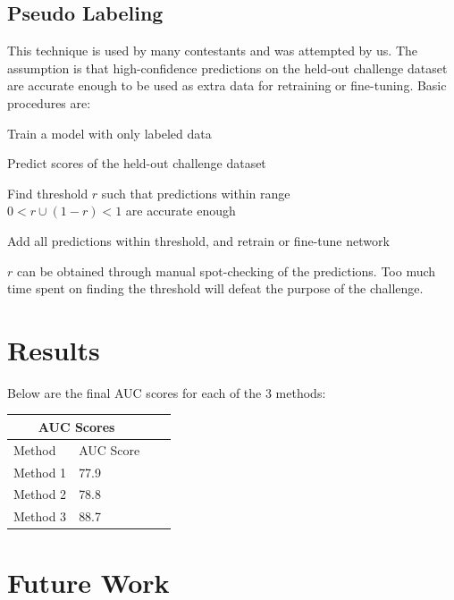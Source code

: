 \documentclass[10pt,twocolumn,letterpaper]{article}
\newenvironment{alt_enumerate}
{ \begin{enumerate}
		\setlength{\itemsep}{1pt}
		\setlength{\parskip}{1pt}
		\setlength{\parsep}{1pt} }
	{ \end{enumerate} }
\begin{document}
\subsection{Pseudo Labeling}

This technique is used by many contestants and was attempted by us. The
assumption is that high-confidence predictions on the held-out challenge
dataset are accurate enough to be used as extra data for retraining or
fine-tuning. Basic procedures are:

\begin{alt_enumerate}
	\item{Train a model with only labeled data}
	\item{Predict scores of the held-out challenge dataset}
	\item{Find threshold \(r\) such that predictions within range\\
		\(0<r \cup (1-r)<1\) are accurate enough}
	\item{Add all predictions within threshold, and retrain or fine-tune
		network}
\end{alt_enumerate}

\(r\) can be obtained through manual spot-checking of the predictions. Too
much time spent on finding the threshold will defeat the purpose of the
challenge.

\section{Results}

Below are the final AUC scores for each of the 3 methods:\\

\begin{tabular}{ |p{2cm}|p{2cm}|p{2cm}|p{2cm}| }
	\hline
	\multicolumn{2}{|c|}{AUC Scores}\\
	\hline
	Method & AUC Score\\
	\hline
	Method 1 & 77.9\\
	Method 2 & 78.8\\
	Method 3 & 88.7\\
	\hline
\end{tabular}

\section{Future Work}
\end{document}
